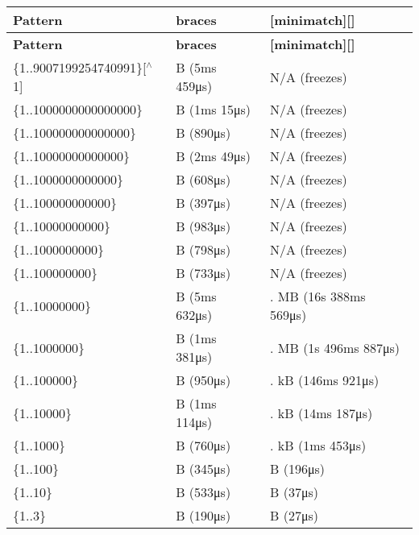 \tabulinesep=1mm
\begin{longtabu} spread 0pt [c]{*{3}{|X[-1]}|}
\hline
\rowcolor{\tableheadbgcolor}\textbf{ {\bfseries Pattern}  }&\textbf{ {\bfseries braces}  }&\textbf{ {\bfseries \mbox{[}minimatch\mbox{]}\mbox{[}\mbox{]}}   }\\
\endfirsthead
\hline
\endfoot
\hline
\rowcolor{\tableheadbgcolor}\textbf{ {\bfseries Pattern}  }&\textbf{ {\bfseries braces}  }&\textbf{ {\bfseries \mbox{[}minimatch\mbox{]}\mbox{[}\mbox{]}}   }\\
\endhead
{\ttfamily \{1..9007199254740991\}}\mbox{[}$^\wedge$1\mbox{]}  &{ B} (5ms 459μs)  &N/A (freezes)   \\
{\ttfamily \{1..1000000000000000\}}  &{ B} (1ms 15μs)  &N/A (freezes)   \\
{\ttfamily \{1..100000000000000\}}  &{ B} (890μs)  &N/A (freezes)   \\
{\ttfamily \{1..10000000000000\}}  &{ B} (2ms 49μs)  &N/A (freezes)   \\
{\ttfamily \{1..1000000000000\}}  &{ B} (608μs)  &N/A (freezes)   \\
{\ttfamily \{1..100000000000\}}  &{ B} (397μs)  &N/A (freezes)   \\
{\ttfamily \{1..10000000000\}}  &{ B} (983μs)  &N/A (freezes)   \\
{\ttfamily \{1..1000000000\}}  &{ B} (798μs)  &N/A (freezes)   \\
{\ttfamily \{1..100000000\}}  &{ B} (733μs)  &N/A (freezes)   \\
{\ttfamily \{1..10000000\}}  &{ B} (5ms 632μs)  &{. MB} (16s 388ms 569μs)   \\
{\ttfamily \{1..1000000\}}  &{ B} (1ms 381μs)  &{. MB} (1s 496ms 887μs)   \\
{\ttfamily \{1..100000\}}  &{ B} (950μs)  &{. kB} (146ms 921μs)   \\
{\ttfamily \{1..10000\}}  &{ B} (1ms 114μs)  &{. kB} (14ms 187μs)   \\
{\ttfamily \{1..1000\}}  &{ B} (760μs)  &{. kB} (1ms 453μs)   \\
{\ttfamily \{1..100\}}  &{ B} (345μs)  &{ B} (196μs)   \\
{\ttfamily \{1..10\}}  &{ B} (533μs)  &{ B} (37μs)   \\
{\ttfamily \{1..3\}}  &{ B} (190μs)  &{ B} (27μs)   \\
\end{longtabu}



